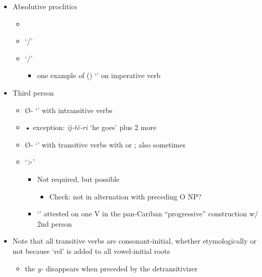 \documentclass{memoir}
\begin{document}
\begin{itemize}
\tightlist
\item
  Absolutive proclitics

  \begin{itemize}
  \tightlist
  \item
  \item
     `/'
  \item
     `/'

    \begin{itemize}
    \tightlist
    \item
      one example of () `' on imperative verb
    \end{itemize}
  \end{itemize}
\item
  Third person

  \begin{itemize}
  \tightlist
  \item
    Ø‑ `' with intransitive verbs
  \item
    • exception: \emph{ij‑të‑ri} `he goes' plus 2 more
  \item
    Ø‑ `' with transitive verbs with  or
    ; also sometimes 
  \item
     `\textgreater{}'

    \begin{itemize}
    \tightlist
    \item
      Not required, but possible

      \begin{itemize}
      \tightlist
      \item
        Check: not in alternation with preceding O NP?
      \end{itemize}
    \item
       `' attested on one V in the pan‑Cariban
      ``progressive'' construction w/ 2nd person 
    \end{itemize}
  \end{itemize}
\item
  Note that all transitive verbs are consonant‑initial, whether
  etymologically or not because  `rel' is added to all
  vowel‑initial roots

  \begin{itemize}
  \tightlist
  \item
    the \emph{y‑} disappears when preceded by the detransitivizer
  \end{itemize}
\end{itemize}
\end{document}
